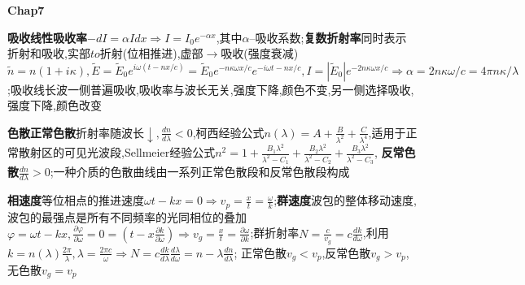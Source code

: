 \documentclass[10pt,a4paper]{article}
\begin{document}
\textbf{\textbf{Chap7}}

\textbf{吸收线性吸收率}$-dI=\alpha Idx\Longrightarrow I=I_0e^{-\alpha x}$,其中$\alpha$--吸收系数;\textbf{复数折射率}同时表示折射和吸收,实部$to$折射(位相推进),虚部$\to$吸收(强度衰减)$\widetilde{n}=n(1+i\kappa),\widetilde{E}=\widetilde{E}_0e^{i\omega(t-nx/c)}=\widetilde{E}_0e^{-n\kappa\omega x/c}e^{-i\omega{t-nx/c}},I=|\widetilde{E}_0|e^{-2n\kappa\omega x/c}\Longrightarrow\alpha=2n\kappa\omega/c=4\pi n\kappa/\lambda$;吸收线长波一侧普遍吸收,吸收率与波长无关,强度下降,颜色不变,另一侧选择吸收,强度下降,颜色改变

\textbf{色散正常色散}折射率随波长$\downarrow,\frac{dn}{d\lambda}<0$,柯西经验公式$n(\lambda)=A+\frac{B}{\lambda^2}+\frac{C}{\lambda^4}$,适用于正常散射区的可见光波段,Sellmeier经验公式$n^2=1+\frac{B_1\lambda^2}{\lambda^2-C_1}+\frac{B_2\lambda^2}{\lambda^2-C_2}+\frac{B_3\lambda^2}{\lambda^2-C_3}$, \textbf{反常色散}$\frac{dn}{d\lambda}>0$;一种介质的色散曲线由一系列正常色散段和反常色散段构成

\textbf{相速度}等位相点的推进速度$\omega t-kx=0\Longrightarrow v_p=\frac{x}{t}=\frac{\omega}{k}$;\textbf{群速度}波包的整体移动速度,波包的最强点是所有不同频率的光同相位的叠加$\varphi=\omega t-kx,\frac{\partial\varphi}{\partial\omega}=0=(t-x\frac{\partial k}{\partial\omega})\Longrightarrow v_{g}=\frac{x}{t}=\frac{\partial\omega}{\partial k}$;群折射率$N=\frac{c}{v_g}=c\frac{dk}{d\omega}$,利用$k=n(\lambda)\frac{2\pi}{\lambda},\lambda=\frac{2\pi c}{\omega}\Longrightarrow N=c\frac{dk}{d\lambda}\frac{d\lambda}{d\omega}=n-\lambda\frac{dn}{d\lambda}$; 正常色散$v_g<v_p$,反常色散$v_g>v_p$,无色散$v_g=v_p$

\newpage
\end{document}
